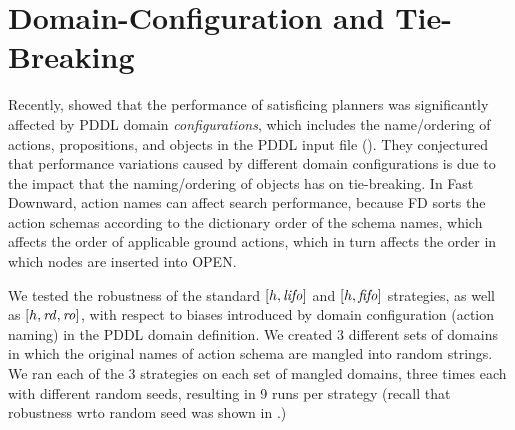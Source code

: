 \section{Domain-Configuration and Tie-Breaking}
Recently, \citeauthor{vallati2015effective} showed that the performance of 
satisficing planners was significantly affected by PDDL domain \emph{configurations}, which includes the name/ordering of actions, propositions, and objects in the PDDL input file (\citeyear{vallati2015effective}).
They conjectured that performance variations caused
by different domain configurations is due to the impact that the naming/ordering of objects has on tie-breaking.
In Fast Downward, action names can affect search performance, because FD 
sorts the action schemas according to the dictionary
order of the schema names, which affects the order of applicable ground
actions, which in turn affects the order in which nodes
are inserted into OPEN.


We tested the robustness of the standard $[h,\mbox{\textit{lifo}}]$ and $[h,\mbox{\textit{fifo}}]$ strategies, as well as $[h,\mbox{\textit{rd}},\mbox{\textit{ro}}]$,
with respect to 
biases introduced by domain configuration (action naming) in the PDDL domain definition.
We created 3 different sets of domains in which the
original names of action schema are mangled into random strings. 
We ran each of the 3 strategies on each
set of mangled domains, three times each with different random seeds,
resulting in 9 runs per strategy (recall that robustness wrto random seed was shown in .)

